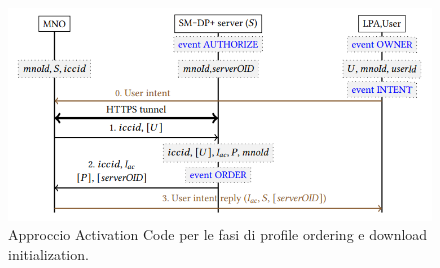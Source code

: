 \documentclass[10pt, oneside]{book}
\begin{document}
\begin{figure}
\includegraphics[width=\linewidth]{activation-code.png}
\caption{Approccio Activation Code per le fasi di profile ordering e download initialization.}
\label{fig:activation-code}
\end{figure}
\end{document}
